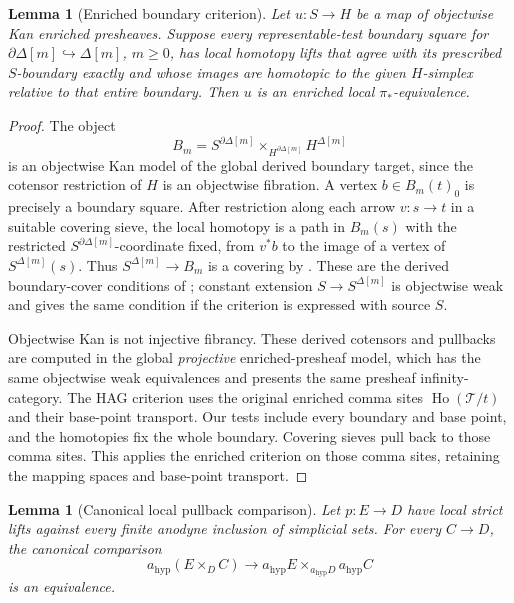 \documentclass[12pt]{amsart}
\newtheorem{lem}[thm]{Lemma}
\theoremstyle{definition}
\theoremstyle{remark}
\numberwithin{equation}{section}
\newcommand{\CT}{\mathcal T}
\begin{document}
\begin{lem}[Enriched boundary criterion]
Let $u:S\to H$ be a map of objectwise Kan enriched
presheaves.
\label{lem:enriched-boundary-criterion}
Suppose every representable-test boundary square for
$\partial\Delta[m]\hookrightarrow\Delta[m]$, $m\ge0$,
has local homotopy lifts that agree with its prescribed
$S$-boundary exactly and whose images are homotopic to
the given $H$-simplex relative to that entire boundary.
Then $u$ is an enriched local $\pi_*$-equivalence.
\end{lem}

\begin{proof}
The object
\[
 B_m=S^{\partial\Delta[m]}
       \times_{H^{\partial\Delta[m]}}H^{\Delta[m]}
\]
is an objectwise Kan model of the global derived
boundary target, since the cotensor restriction of
$H$ is an objectwise fibration. A vertex
$b\in B_m(t)_0$ is precisely a boundary square.
After restriction along each arrow $v:s\to t$ in a
suitable covering sieve, the local homotopy is a path
in $B_m(s)$ with the restricted
$S^{\partial\Delta[m]}$-coordinate fixed, from $v^*b$
to the image of a vertex of $S^{\Delta[m]}(s)$.
Thus $S^{\Delta[m]}\to B_m$ is a covering by
\cite[Proposition~3.1.4]{HAGI2005}. These are the
derived boundary-cover conditions of
\cite[Lemma~3.3.3, PDF leaf~24]{HAGI2005};
constant extension $S\to S^{\Delta[m]}$ is
objectwise weak and gives the same condition if the
criterion is expressed with source $S$.

Objectwise Kan is not injective fibrancy. These
derived cotensors and pullbacks are computed in the
global \emph{projective} enriched-presheaf model,
which has the same objectwise weak equivalences and
presents the same presheaf infinity-category.
The HAG criterion uses the original enriched comma
sites $\operatorname{Ho}(\CT/t)$ and their base-point
transport. Our tests include every boundary and base
point, and the homotopies fix the whole boundary.
Covering sieves pull back to those comma sites.
This applies the enriched criterion on those comma
sites, retaining the mapping spaces and base-point
transport.
\end{proof}

\begin{lem}[Canonical local pullback comparison]
Let $p:E\to D$ have local strict lifts against every
finite anodyne inclusion of simplicial sets.
\label{lem:enriched-local-homotopy-pullback}
For every $C\to D$, the canonical comparison
\[
 a_{\mathrm{hyp}}(E\times_D C)
 \longrightarrow
 a_{\mathrm{hyp}}E
 \times_{a_{\mathrm{hyp}}D}a_{\mathrm{hyp}}C
\]
is an equivalence.
\end{lem}
\end{document}
